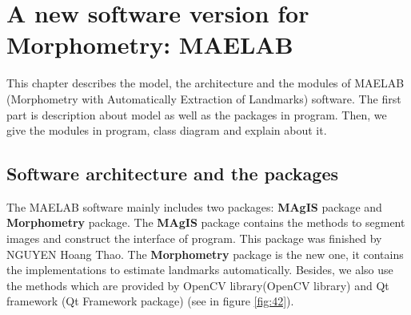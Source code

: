 \chapter{A new software version for Morphometry: MAELAB}
This chapter describes the model, the architecture and the modules of MAELAB (Morphometry with Automatically Extraction of Landmarks) software. The first part is description about model as well as the packages in program. Then, we give the modules in program, class diagram and explain about it.
\section{Software architecture and the packages}
The MAELAB software mainly includes two packages: \textbf{MAgIS} package and \textbf{Morphometry} package. The \textbf{MAgIS} package contains the methods to segment images and construct the interface of program. This package was finished by NGUYEN Hoang Thao. The \textbf{Morphometry} package is the new one, it contains the implementations to estimate landmarks automatically. Besides, we also use the methods which are provided by OpenCV library(OpenCV library) and Qt framework (Qt Framework package) (see in figure \ref{fig:42}).
